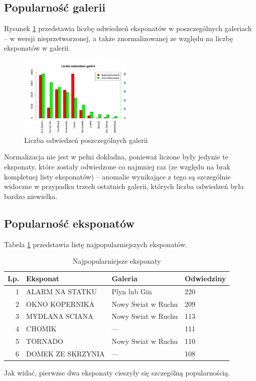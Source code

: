 \documentclass[conference]{IEEEtran}
\begin{document}
\subsection{Popularność galerii}
Rysunek \ref{galerie} przedstawia liczbę odwiedzeń eksponatów w poszczególnych galeriach -- w wersji nieprzetworzonej, a także znormalizowanej ze względu na liczbę eksponatów w galerii.
\begin{figure}[H]
\includegraphics[width=0.48\textwidth]{galerie.png}
\caption{Liczba odwiedzeń poszczególnych galerii}
\label{galerie}
\end{figure}
Normalizacja nie jest w pełni dokładna, ponieważ liczone były jedynie te eksponaty, które zostały odwiedzone co najmniej raz (ze względu na brak kompletnej listy eksponatów) -- anomalie wynikające z tego są szczególnie widoczne w przypadku trzech ostatnich galerii, których liczba odwiedzeń była bardzo niewielka.
\subsection{Popularność eksponatów}
Tabela \ref{top_eksponaty} przedstawia listę najpopularniejszych eksponatów.
\begin{table}[H]
\caption{Najpopularniejsze eksponaty}
\label{top_eksponaty}
\centering
\begin{tabular}{|r|l|l|l|}
\hline
\textbf{Lp.} & \textbf{Eksponat} & \textbf{Galeria} & \textbf{Odwiedziny} \\
\hline
 1 &   ALARM NA STATKU  &     Plyn lub Gin     &         220 \\
 2 &   OKNO KOPERNIKA & Nowy Swiat w Ruchu    &          209 \\
 3 &   MYDLANA SCIANA & Nowy Swiat w Ruchu   &           113 \\
 4 &           CHOMIK  &           ---    &          111 \\
 5 &          TORNADO & Nowy Swiat w Ruchu    &          110 \\
 6 & DOMEK ZE SKRZYNIA  &           ---   &          108 \\
\hline
\end{tabular}
\end{table}
Jak widać, pierwzse dwa eksponaty cieszyły się szczególną popularnością.
\end{document}
